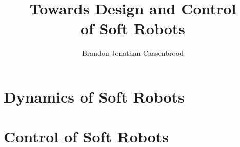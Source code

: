 \documentclass[10pt]{phd}
\title{Towards Design and Control \\ of Soft Robots}
\author{Brandon Jonathan Caasenbrood}
\begin{document}
%

\chapter{Dynamics of Soft Robots}
\label{ch:2-dynamics} 
	
	
	
	

\chapter{Control of Soft Robots}
	
	

\appendix

%


\end{document}
